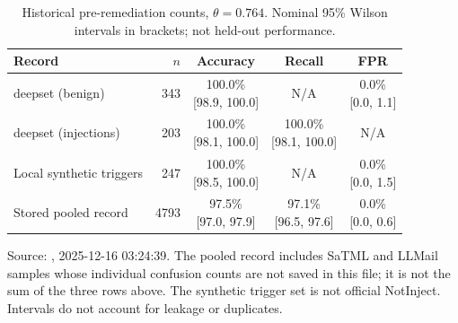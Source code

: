 \begin{table}[H]
\centering
\small
\caption{Historical pre-remediation counts, $\theta=0.764$. Nominal 95\% Wilson intervals in brackets; not held-out performance.}
\label{tab:per-dataset-metrics}
\begin{tabular}{lrccc}
\toprule
\textbf{Record} & $n$ & \textbf{Accuracy} & \textbf{Recall} & \textbf{FPR} \\
\midrule
deepset (benign) & 343 & \shortstack{100.0\% \\ {[98.9, 100.0]}} & N/A & \shortstack{0.0\% \\ {[0.0, 1.1]}} \\[3pt]
deepset (injections) & 203 & \shortstack{100.0\% \\ {[98.1, 100.0]}} & \shortstack{100.0\% \\ {[98.1, 100.0]}} & N/A \\[3pt]
Local synthetic triggers & 247 & \shortstack{100.0\% \\ {[98.5, 100.0]}} & N/A & \shortstack{0.0\% \\ {[0.0, 1.5]}} \\[3pt]
\midrule
Stored pooled record & 4793 & \shortstack{97.5\% \\ {[97.0, 97.9]}} & \shortstack{97.1\% \\ {[96.5, 97.6]}} & \shortstack{0.0\% \\ {[0.0, 0.6]}} \\[3pt]
\bottomrule
\end{tabular}
\par\smallskip
\begin{minipage}{\linewidth}\footnotesize
Source: , 2025-12-16 03:24:39. The pooled record includes SaTML and LLMail samples whose individual confusion counts are not saved in this file; it is not the sum of the three rows above. The synthetic trigger set is not official NotInject. Intervals do not account for leakage or duplicates.
\end{minipage}
\end{table}
